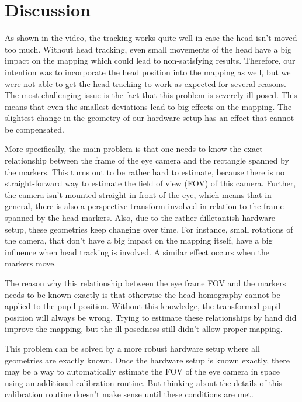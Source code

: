 \section{Discussion}\label{discussion}

As shown in the video, the tracking works quite well in case the head isn't moved too much. 
Without head tracking, even small movements of the head have a big impact on the mapping which could lead to non-satisfying results.
Therefore, our intention was to incorporate the head position into the mapping as well, but we were not able to get the head tracking to work as expected for several reasons. 
The most challenging issue is the fact that this problem is severely ill-posed. This means that even the smallest deviations lead to big effects on the mapping. The slightest change in the geometry of our hardware setup has an effect that cannot be compensated.

More specifically, the main problem is that one needs to know the exact relationship between the frame of the eye camera and the rectangle spanned by the markers. 
This turns out to be rather hard to estimate, because there is no straight-forward way to estimate the field of view (FOV) of this camera. 
Further, the camera isn't mounted straight in front of the eye, which means that in general, there is also a perspective transform involved in relation to the frame spanned by the head markers. 
Also, due to the rather dilletantish hardware setup, these geometries keep changing over time. 
For instance, small rotations of the camera, that don't have a big impact on the mapping itself, have a big influence when head tracking is involved.
A similar effect occurs when the markers move. 

The reason why this relationship between the eye frame FOV and the markers needs to be known exactly is that otherwise the head homography cannot be applied to the pupil position. Without this knowledge, the transformed pupil position will always be wrong. Trying to estimate these relationships by hand did improve the mapping, but the ill-posedness still didn't allow proper mapping. 

This problem can be solved by a more robust hardware setup where all geometries are exactly known. 
Once the hardware setup is known exactly, there may be a way to automatically estimate the FOV of the eye camera in space using an additional calibration routine. 
But thinking about the details of this calibration routine doesn't make sense until these conditions are met.

